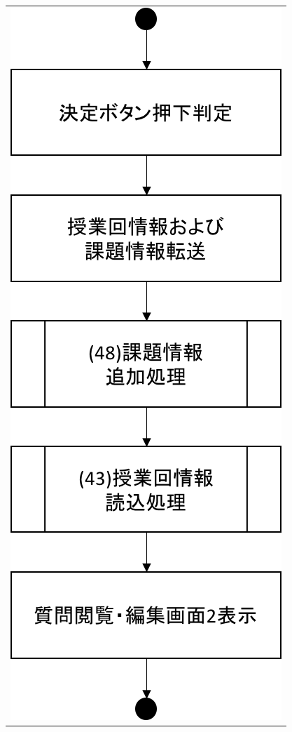 \begin{figure}[htbp]
\begin{tabular}{c}
\begin{minipage}{0.33\hsize}
\begin{center}
   \includegraphics[width=0.8\linewidth,clip]{./img/flow/47.png}
  \end{center}
 \end{minipage}

\end{tabular}
\end{figure}
